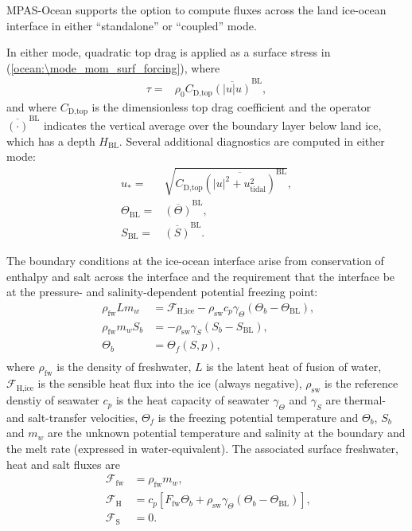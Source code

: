 MPAS-Ocean supports the option to compute fluxes across 
the land ice-ocean interface in either ``standalone'' or ``coupled''
mode.  

In either mode, quadratic top drag is applied as a surface stress 
in (\ref{ocean:\mode_mom_surf_forcing}), where
\begin{align}
\tau = & \rho_0 C_\textrm{D,top} \overline{\left(|u| u\right)}^\textrm{BL},
\end{align}
and where $C_\textrm{D,top}$ is the dimensionless top drag coefficient
and the operator $\overline{\left(\cdot\right)}^\textrm{BL}$ indicates 
the vertical average over the boundary layer below land ice, which
has a depth $H_\textrm{BL}$.  Several additional diagnostics are computed
in either mode:
\begin{align}
u_* = & \sqrt{C_\textrm{D,top} \overline{\left(|u|^2+u_\textrm{tidal}^2\right)}^\textrm{BL}}, \\
\Theta_\textrm{BL} = & \overline{\left(\Theta\right)}^\textrm{BL}, \\
S_\textrm{BL} = & \overline{\left(S\right)}^\textrm{BL}.
\end{align}

The boundary conditions at the ice-ocean interface arise
from conservation of enthalpy and salt across the interface and the requirement that the interface
be at the pressure- and salinity-dependent potential freezing point:
\begin{align}
   \rho_\textrm{fw} L m_w & = \mathcal{F}_\textrm{H,ice} - \rho_\textrm{sw} c_p \gamma_\Theta \left(\Theta_b - \Theta_\textrm{BL} \right), \label{ocean:\mode_land_ice_enthalpy_balance}\\
   \rho_\textrm{fw} m_w S_b & = - \rho_\textrm{sw} \gamma_S \left(S_b - S_\textrm{BL}\right),  \\
   \Theta_b & = \Theta_f(S,p), \\
\end{align}
where $\rho_\textrm{fw}$ is the density of freshwater, $L$ is the latent heat of fusion of
water, $\mathcal{F}_\textrm{H,ice}$ is the sensible heat flux into the ice (always negative),
$\rho_\textrm{sw}$ is the reference denstiy of seawater $c_p$ is the heat capacity of seawater
$\gamma_\Theta$ and $\gamma_S$ are thermal- and salt-transfer velocities,
$\Theta_f$ is the freezing potential temperature and $\Theta_b$, $S_b$ and $m_w$ are the
unknown potential temperature and salinity at the boundary and the melt rate (expressed in 
water-equivalent).  The associated surface freshwater, heat and salt fluxes are
\begin{align}
   \mathcal{F}_\textrm{fw} & = \rho_\textrm{fw} m_w, \\
   \mathcal{F}_\textrm{H} & = c_p \left[F_\textrm{fw} \Theta_b + \rho_\textrm{sw} \gamma_\Theta \left(\Theta_b - \Theta_\textrm{BL}\right)\right], \\
   \mathcal{F}_\textrm{S} & = 0.
\end{align}

